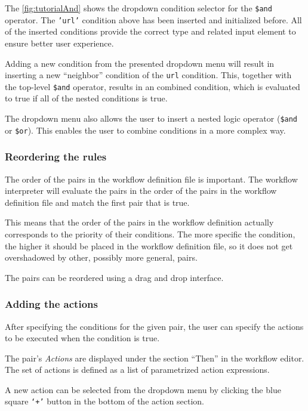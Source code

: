 The \autoref{fig:tutorialAnd} shows the dropdown condition selector for the \texttt{\$and} operator.
The \texttt{'url'} condition above has been inserted and initialized before.
All of the inserted conditions provide the correct type and related input element to ensure better user experience.

Adding a new condition from the presented dropdown menu will result in inserting a new ``neighbor'' condition of the \texttt{url} condition.
This, together with the top-level \texttt{\$and} operator, results in an combined condition, which is evaluated to true if all of the nested conditions is true.

The dropdown menu also allows the user to insert a nested logic operator (\texttt{\$and} or \texttt{\$or}).
This enables the user to combine conditions in a more complex way.

\subsubsection{Reordering the rules}
    The order of the pairs in the workflow definition file is important.
    The workflow interpreter will evaluate the pairs in the order of the pairs in the workflow definition file
    and match the first pair that is true.

    This means that the order of the pairs in the workflow definition actually corresponds to the priority of their conditions.
    The more specific the condition, the higher it should be placed in the workflow definition file, so it does not get overshadowed by other, possibly more general, pairs.

    The pairs can be reordered using a drag and drop interface.

\subsubsection{Adding the actions}
After specifying the conditions for the given pair, the user can specify the actions to be executed when the condition is true.

The pair's \textit{Actions} are displayed under the section ``Then'' in the workflow editor.
The set of actions is defined as a list of parametrized action expressions.

A new action can be selected from the dropdown menu by clicking the blue square \texttt{`+'} button in the bottom of the action section.

